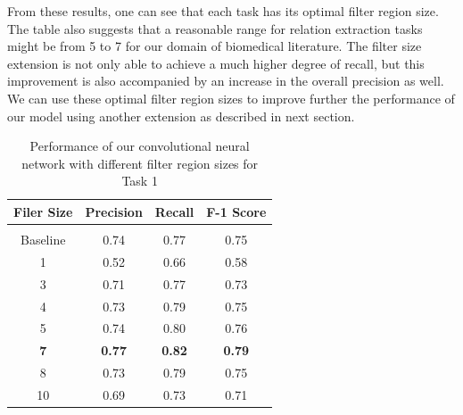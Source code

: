 From these results, one can see that each task has its optimal filter region size. The table also suggests that a reasonable range for relation extraction tasks might be from 5 to 7 for our domain of biomedical literature. The filter size extension is not only able to achieve a much higher degree of recall, but this improvement is also accompanied by an increase in the overall precision as well. We can use these optimal filter region sizes to improve further the performance of our model using another extension as described in next section. 
\begin{table}[ht]
    \centering
    \caption{Performance of our convolutional neural network with different filter region sizes for Task 1}
    \begin{tabular}{c  c  c  c}
         \toprule
         \textbf{Filer Size}        &   \textbf{Precision}      &   \textbf{Recall}            &   \textbf{F-1 Score}      \\
         \midrule
         \\[-1em]
         
         Baseline                   &   0.74                    &            0.77                       &   0.75                    \\

         1                          &   0.52                    &             0.66                       &   0.58                    \\

         3                          &   0.71                    &             0.77                       &   0.73                    \\

         4                          &   0.73                    &             0.79                       &   0.75                    \\
         
         5                          &   0.74                    &             0.80                       &   0.76                    \\
         
         \textbf{7}                 &   \textbf{0.77}           &             \textbf{0.82}              &   \textbf{0.79}           \\
         
         8                          &   0.73                    &             0.79                       &   0.75                    \\
         
         10                         &   0.69                    &             0.73                       &   0.71                    \\
         
         \bottomrule
    \end{tabular}
    \label{table:task1-filter-size-results}
    \vspace{0.1in}
\end{table}

